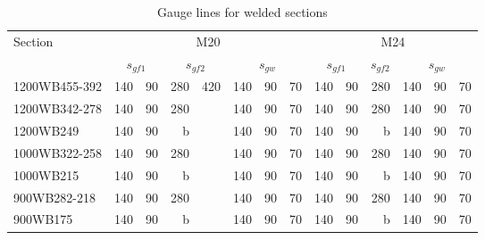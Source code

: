 \begin{table}[H]
\centering\scriptsize
\caption{Gauge lines for welded sections}\label{tab:weld_gauge}
\begin{minipage}{.8\linewidth}\centering
\begin{tabular}{l|rr|rr|rrr|rr|r|rrr}
	\toprule
	\multirow{2}[0]{*}{Section} &                                    \multicolumn{7}{c|}{M20}                                     &                                    \multicolumn{6}{c}{M24}                                     \\
	                            & \multicolumn{2}{c|}{$s_{gf1}$} & \multicolumn{2}{c|}{$s_{gf2}$} & \multicolumn{3}{c|}{$s_{gw}$} & \multicolumn{2}{c|}{$s_{gf1}$} & \multicolumn{1}{c|}{$s_{gf2}$} & \multicolumn{3}{c}{$s_{gw}$} \\ \midrule
	1200WB455-392               & 140 &                       90 & 280 &                      420 & 140 & 90 &                 70 & 140 &                       90 &                            280 & 140 & 90 &                70 \\
	1200WB342-278               & 140 &                       90 & 280 &                          & 140 & 90 &                 70 & 140 &                       90 &                            280 & 140 & 90 &                70 \\
	1200WB249                   & 140 &                       90 &   b &                          & 140 & 90 &                 70 & 140 &                       90 &                              b & 140 & 90 &                70 \\
	1000WB322-258               & 140 &                       90 & 280 &                          & 140 & 90 &                 70 & 140 &                       90 &                            280 & 140 & 90 &                70 \\
	1000WB215                   & 140 &                       90 &   b &                          & 140 & 90 &                 70 & 140 &                       90 &                              b & 140 & 90 &                70 \\
	900WB282-218                & 140 &                       90 & 280 &                          & 140 & 90 &                 70 & 140 &                       90 &                            280 & 140 & 90 &                70 \\
	900WB175                    & 140 &                       90 &   b &                          & 140 & 90 &                 70 & 140 &                       90 &                              b & 140 & 90 &                70 \\

\end{tabular}
\end{minipage}
\end{table}
